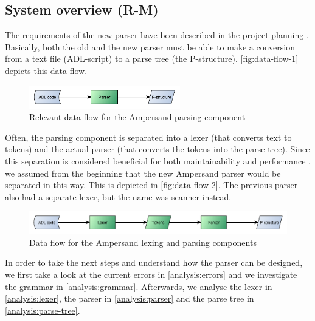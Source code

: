 
\subsection{System overview (R-M)}
The requirements of the new parser have been described in the project planning .
Basically, both the old and the new parser must be able to make a conversion from a text file (ADL-script) to a parse tree (the P-structure).
\autoref{fig:data-flow-1} depicts this data flow.
%
\begin{figure}[htb!]
	\centering
	\includegraphics[width=0.586\textwidth]{Figures/DataFlow1}
	\caption{Relevant data flow for the Ampersand parsing component}
	\label{fig:data-flow-1}
\end{figure}

Often, the parsing component is separated into a lexer (that converts text to tokens) and the actual parser (that converts the tokens into the parse tree).
Since this separation is considered beneficial for both maintainability and performance , we assumed from the beginning that the new Ampersand parser would be separated in this way.
This is depicted in \autoref{fig:data-flow-2}.
The previous parser also had a separate lexer, but the name was scanner instead.
%
\begin{figure}[htb!]
	\centering
	\includegraphics[width=1\textwidth]{Figures/DataFlow2}
	\caption{Data flow for the Ampersand lexing and parsing components}
	\label{fig:data-flow-2}
\end{figure}

In order to take the next steps and understand how the parser can be designed, we first take a look at the current errors in \autoref{analysis:errors} and we investigate the grammar in \autoref{analysis:grammar}.
Afterwards, we analyse the lexer in \autoref{analysis:lexer}, the parser in \autoref{analysis:parser} and the parse tree in \autoref{analysis:parse-tree}.
